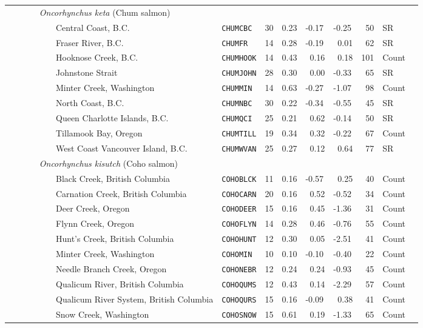 \begin{flushleft}
\begin{tabular*}{7.1in}{llllllllll}
&{\it~~~~~Oncorhynchus keta} (Chum salmon)&~&~&~&~&~&~&~  & \\ 
&~~~~~~~~~Central Coast, B.C.&{\tt CHUMCBC}&30&0.23&-0.17&-0.25&~50&SR  & \\ 
&~~~~~~~~~Fraser River, B.C.&{\tt CHUMFR}&14&0.28&-0.19&~0.01&~62&SR  & \\ 
&~~~~~~~~~Hooknose Creek, B.C.&{\tt CHUMHOOK}&14&0.43&~0.16&~0.18&101&Count  & \\ 
&~~~~~~~~~Johnstone Strait&{\tt CHUMJOHN}&28&0.30&~0.00&-0.33&~65&SR  & \\ 
&~~~~~~~~~Minter Creek, Washington&{\tt CHUMMIN}&14&0.63&-0.27&-1.07&~98&Count  & \\ 
&~~~~~~~~~North Coast, B.C.&{\tt CHUMNBC}&30&0.22&-0.34&-0.55&~45&SR  & \\ 
&~~~~~~~~~Queen Charlotte Islands, B.C.&{\tt CHUMQCI}&25&0.21&~0.62&-0.14&~50&SR  & \\ 
&~~~~~~~~~Tillamook Bay, Oregon&{\tt CHUMTILL}&19&0.34&~0.32&-0.22&~67&Count  & \\ 
&~~~~~~~~~West Coast Vancouver Island, B.C.&{\tt CHUMWVAN}&25&0.27&~0.12&~0.64&~77&SR  & \\ 
&{\it~~~~~Oncorhynchus kisutch} (Coho salmon)&~&~&~&~&~&~&~  & \\ 
&~~~~~~~~~Black Creek, British Columbia&{\tt COHOBLCK}&11&0.16&-0.57&~0.25&~40&Count  & \\ 
&~~~~~~~~~Carnation Creek, British Columbia&{\tt COHOCARN}&20&0.16&~0.52&-0.52&~34&Count  & \\ 
&~~~~~~~~~Deer Creek, Oregon&{\tt COHODEER}&15&0.16&~0.45&-1.36&~31&Count  & \\ 
&~~~~~~~~~Flynn Creek, Oregon&{\tt COHOFLYN}&14&0.28&~0.46&-0.76&~55&Count  & \\ 
&~~~~~~~~~Hunt's Creek, British Columbia&{\tt COHOHUNT}&12&0.30&~0.05&-2.51&~41&Count  & \\ 
&~~~~~~~~~Minter Creek, Washington&{\tt COHOMIN}&10&0.10&-0.10&-0.40&~22&Count  & \\ 
&~~~~~~~~~Needle Branch Creek, Oregon&{\tt COHONEBR}&12&0.24&~0.24&-0.93&~45&Count  & \\ 
&~~~~~~~~~Qualicum River, British Columbia&{\tt COHOQUMS}&12&0.43&~0.14&-2.29&~57&Count  & \\ 
&~~~~~~~~~Qualicum River System, British Columbia&{\tt COHOQURS}&15&0.16&-0.09&~0.38&~41&Count  & \\ 
&~~~~~~~~~Snow Creek, Washington&{\tt COHOSNOW}&15&0.61&~0.19&-1.33&~65&Count  & \\ 

\end{tabular*}
\end{flushleft}
